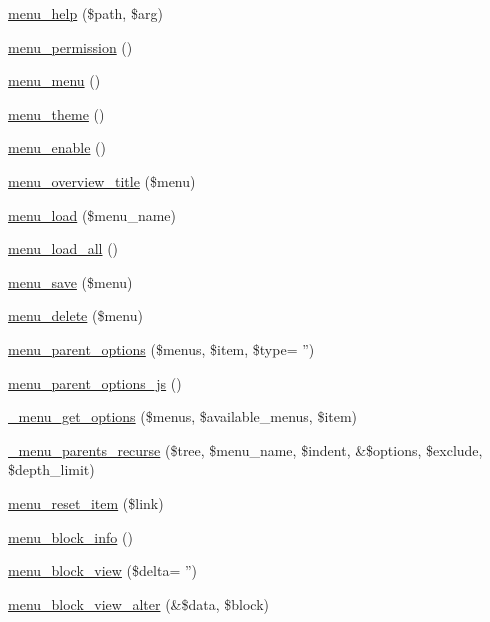 \begin{DoxyCompactItemize}
\item 
\hyperlink{menu_8module_a5a8f5faa611ccce11d6549e1948e145e}{menu\_\-help} (\$path, \$arg)
\item 
\hyperlink{menu_8module_a409234819573fb6e0fe8d87c4d7c25ec}{menu\_\-permission} ()
\item 
\hyperlink{menu_8module_ac0012895e202460feb36ec41688c4486}{menu\_\-menu} ()
\item 
\hyperlink{menu_8module_a726e874946f3c2090e19aee6119be702}{menu\_\-theme} ()
\item 
\hyperlink{menu_8module_a053bee28fef24dd06398ab568a068aff}{menu\_\-enable} ()
\item 
\hyperlink{menu_8module_a425d43fa360ea3528b502f1b2a90eaac}{menu\_\-overview\_\-title} (\$menu)
\item 
\hyperlink{menu_8module_afa91fb0278c163a85e7a0913d7fedb3b}{menu\_\-load} (\$menu\_\-name)
\item 
\hyperlink{menu_8module_a87b63b5f4643ea32aa5a54e2d7cac32d}{menu\_\-load\_\-all} ()
\item 
\hyperlink{menu_8module_a005ec36cc6d575b6ace69a5b50fccfc4}{menu\_\-save} (\$menu)
\item 
\hyperlink{menu_8module_a73704d0b0e7a71562d8b5dbbc7e7eaa5}{menu\_\-delete} (\$menu)
\item 
\hyperlink{menu_8module_aa1901dfb8654ccbacd62480ccb8c8f9e}{menu\_\-parent\_\-options} (\$menus, \$item, \$type= '')
\item 
\hyperlink{menu_8module_a6143cb84d59ed645141e35bbc1de8325}{menu\_\-parent\_\-options\_\-js} ()
\item 
\hyperlink{menu_8module_ad73c168be42a7567af9d813c21162c20}{\_\-menu\_\-get\_\-options} (\$menus, \$available\_\-menus, \$item)
\item 
\hyperlink{menu_8module_a2152becd93e11121f34a0457a894d324}{\_\-menu\_\-parents\_\-recurse} (\$tree, \$menu\_\-name, \$indent, \&\$options, \$exclude, \$depth\_\-limit)
\item 
\hyperlink{menu_8module_a4f49ddc59d8da61e8b1b9679922f2e11}{menu\_\-reset\_\-item} (\$link)
\item 
\hyperlink{menu_8module_a214dafc0a386328b0819ac9c05852f4b}{menu\_\-block\_\-info} ()
\item 
\hyperlink{menu_8module_a9e012505eaa177213bfedc5031da9e3a}{menu\_\-block\_\-view} (\$delta= '')
\item 
\hyperlink{menu_8module_a03a9506d2f9ea2f32c83a510dcee3968}{menu\_\-block\_\-view\_\-alter} (\&\$data, \$block)

\end{DoxyCompactItemize}
